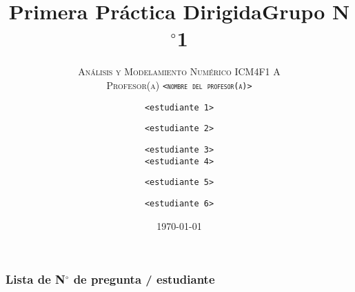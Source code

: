 


\title{
	\huge\sffamily\color{DarkBlue}
	Primera Práctica Dirigida\quad Grupo N$^{\circ}$1
}

\subtitle{
	\large\scshape\color{DarkBlue}
	Análisis y Modelamiento Numérico I\quad CM4F1 A\\[.5\baselineskip]
	\normalsize\normalfont
	Profesor(a) \texttt{<nombre del profesor(a)>}
}

\author{
	\texttt{<estudiante 1>}\qquad\and\qquad
	\texttt{<estudiante 2>}\qquad\and\qquad
	\texttt{<estudiante 3>}\\[\baselineskip]
	\texttt{<estudiante 4>}\qquad\and\qquad
	\texttt{<estudiante 5>}\qquad\and\qquad
	\texttt{<estudiante 6>}\\[\baselineskip]
}


\date{\today} %




\frame{\titlepage}

\begin{frame}
	\frametitle{
		\color{DarkBlue}
		Lista de N$^{\circ}$ de pregunta / estudiante
	}
	\tableofcontents
\end{frame}







